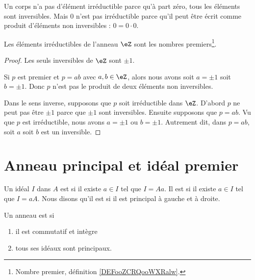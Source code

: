 \begin{example}
	Un corps n'a pas d'élément irréductible parce qu'à part zéro, tous les éléments sont inversibles. Mais \( 0\) n'est pas irréductible parce qu'il peut être écrit comme produit d'éléments non inversibles : \( 0=0\cdot 0\).
\end{example}

\begin{proposition}     \label{PROPooKDWQooTtScrN}
    Les éléments irréductibles de l'anneau \( \eZ\) sont les nombres premiers\footnote{Nombre premier, définition \ref{DEFooZCRQooWXRalw}.}. 
\end{proposition}

\begin{proof}
    Les seuls inversibles de \( \eZ\) sont \( \pm 1\).

    Si \( p\) est premier et \( p=ab\) avec \( a,b\in \eZ\), alors nous avons soit \( a=\pm 1\) soit \( b=\pm 1\). Donc \( p\) n'est pas le produit de deux éléments non inversibles.

    Dans le sens inverse, supposons que \( p\) soit irréductible dans \( \eZ\). D'abord \( p\) ne peut pas être \( \pm 1\) parce que \( \pm 1\) sont inversibles. Ensuite supposons que \( p=ab\). Vu que \( p\) est irréductible, nous avons \( a=\pm1\) ou \( b=\pm1\). Autrement dit, dans \( p=ab\), soit \( a\) soit \( b\) est un inversible.
\end{proof}




\section{Anneau principal et idéal premier}

\begin{definition}      \label{DEFooMZRKooBPLAWH}
	Un idéal \( I\) dans \( A\) est  si il existe \( a\in I\) tel que \( I= A a\). Il est  si il existe \( a\in I\) tel que \( I=a A\). Nous disons qu'il est  si il est principal à gauche et à droite.
\end{definition}

\begin{definition}          \label{DEFooGWOZooXzUlhK}
	Un anneau est  si
	\begin{enumerate}
		\item
		      il est commutatif et intègre
		\item
		      tous ses idéaux sont principaux.
	\end{enumerate}
\end{definition}

